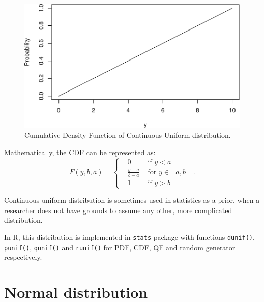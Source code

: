 \documentclass[
]{book}
\theoremstyle{definition}
\theoremstyle{definition}
\theoremstyle{definition}
\theoremstyle{definition}
\theoremstyle{remark}
\begin{document}
\begin{figure}
\centering
\includegraphics{Svetunkov---Statistics-for-Business-Analytics_files/figure-latex/uniformCDFContinuous-1.pdf}
\caption{\label{fig:uniformCDFContinuous}Cumulative Density Function of Continuous Uniform distribution.}
\end{figure}

Mathematically, the CDF can be represented as:
\begin{equation}
    F(y, b, a) = \left\{\begin{aligned}
                        & 0 & \text{ if } y<a \\
                        & \frac{y-a}{b-a} & \text{ for } y \in [a, b] \\
                        & 1 & \text{ if } y>b
                    \end{aligned} \right. .
    \label{eq:ContinuousUniformCDF}
\end{equation}

Continuous uniform distribution is sometimes used in statistics as a prior, when a researcher does not have grounds to assume any other, more complicated distribution.

In R, this distribution is implemented in \texttt{stats} package with functions \texttt{dunif()}, \texttt{punif()}, \texttt{qunif()} and \texttt{runif()} for PDF, CDF, QF and random generator respectively.

\section{Normal distribution}\label{distributionsNormal}
\end{document}
